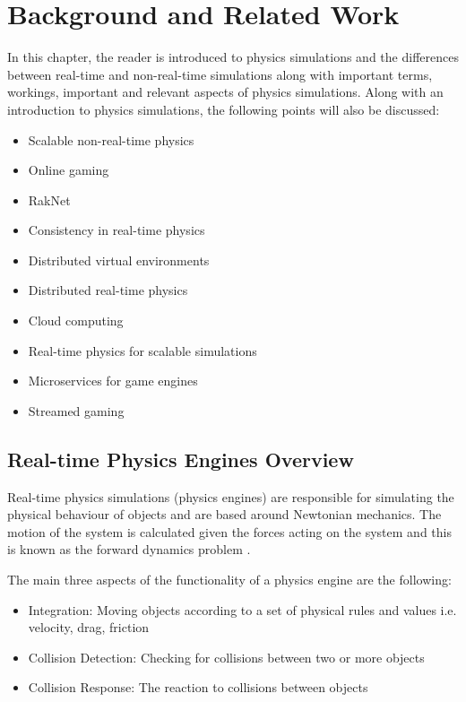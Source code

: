 \chapter{Background and Related Work}
In this chapter, the reader is introduced to physics simulations and the differences between real-time and non-real-time simulations along with important terms, workings, important and relevant aspects of physics simulations. Along with an introduction to physics simulations, the following points will also be discussed:
\begin{itemize}
	\item Scalable non-real-time physics
	\item Online gaming
	\item RakNet
	\item Consistency in real-time physics
	\item Distributed virtual environments
	\item Distributed real-time physics
	\item Cloud computing
	\item Real-time physics for scalable simulations
	\item Microservices for game engines
	\item Streamed gaming
\end{itemize}

\section{Real-time Physics Engines Overview}

Real-time physics simulations (physics engines) are responsible for simulating the physical behaviour of objects and are based around Newtonian mechanics. The motion of the system is calculated given the forces acting on the system and this is known as the forward dynamics problem \cite{Boeing2007}.

The main three aspects of the functionality of a physics engine are the following:
\begin{itemize}
	\item Integration: Moving objects according to a set of physical rules and values i.e. velocity, drag, friction
	\item Collision Detection: Checking for collisions between two or more objects
	\item Collision Response: The reaction to collisions between objects
\end{itemize}

